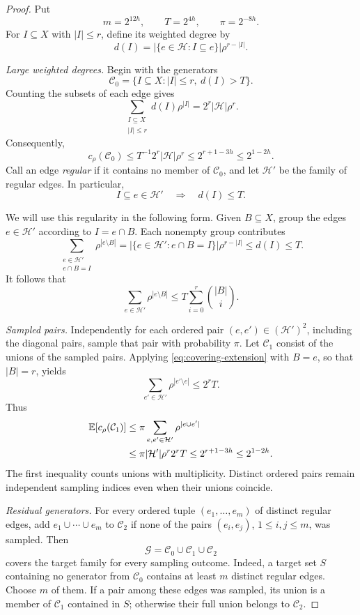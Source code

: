 \documentclass[11pt,letterpaper]{article}
\theoremstyle{definition}
\theoremstyle{remark}
\numberwithin{equation}{section}
\begin{document}
\begin{proof}
Put
\[
m=2^{12h},\qquad T=2^{4h},\qquad \pi=2^{-8h}.
\]
For \(I\subseteq X\) with \(|I|\le r\), define its weighted degree by
\[
d(I)=|\{e\in\mathcal H:I\subseteq e\}|\rho^{r-|I|}.
\]

\emph{Large weighted degrees.}
Begin with the generators
\[
\mathcal C_0=\{I\subseteq X:|I|\le r,\ d(I)>T\}.
\]
Counting the subsets of each edge gives
\[
\sum_{\substack{I\subseteq X\\|I|\le r}}d(I)\rho^{|I|}
=2^r|\mathcal H|\rho^r.
\]
Consequently,
\begin{equation}\label{eq:covering-initial-cost}
c_\rho(\mathcal C_0)
\le T^{-1}2^r|\mathcal H|\rho^r
\le2^{r+1-3h}\le2^{1-2h}.
\end{equation}
Call an edge \emph{regular} if it contains no member of \(\mathcal C_0\),
and let \(\mathcal H'\) be the family of regular edges. In particular,
\[
I\subseteq e\in\mathcal H'
\quad\Longrightarrow\quad d(I)\le T.
\]

We will use this regularity in the following form. Given \(B\subseteq X\),
group the edges \(e\in\mathcal H'\) according to \(I=e\cap B\).
Each nonempty group contributes
\[
\sum_{\substack{e\in\mathcal H'\\e\cap B=I}}
  \rho^{|e\setminus B|}
=|\{e\in\mathcal H':e\cap B=I\}|\rho^{r-|I|}
\le d(I)\le T.
\]
It follows that
\begin{equation}\label{eq:covering-extension}
\sum_{e\in\mathcal H'}\rho^{|e\setminus B|}
\le T\sum_{i=0}^r\binom{|B|}{i}.
\end{equation}

\emph{Sampled pairs.}
Independently for each ordered pair \((e,e')\in(\mathcal H')^2\),
including the diagonal pairs, sample that pair with probability \(\pi\).
Let \(\mathcal C_1\) consist of the unions of the sampled pairs. Applying
\eqref{eq:covering-extension} with \(B=e\), so that \(|B|=r\), yields
\[
\sum_{e'\in\mathcal H'}\rho^{|e'\setminus e|}\le2^rT.
\]
Thus
\begin{align}
\mathbb E[c_\rho(\mathcal C_1)]
&\le\pi\sum_{e,e'\in\mathcal H'}\rho^{|e\cup e'|}
\notag\\
&\le\pi|\mathcal H'|\rho^r2^rT
\le2^{r+1-3h}\le2^{1-2h}.
\label{eq:covering-pair-cost}
\end{align}
The first inequality counts unions with multiplicity. Distinct ordered
pairs remain independent sampling indices even when their unions coincide.

\emph{Residual generators.}
For every ordered tuple \((e_1,\ldots,e_m)\) of distinct regular edges,
add \(e_1\cup\cdots\cup e_m\) to \(\mathcal C_2\) if none of the pairs
\((e_i,e_j)\), \(1\le i,j\le m\), was sampled.
Then
\[
\mathcal G=\mathcal C_0\cup\mathcal C_1\cup\mathcal C_2
\]
covers the target family for every sampling outcome. Indeed, a target set
\(S\) containing no generator from \(\mathcal C_0\) contains at least \(m\)
distinct regular edges. Choose \(m\) of them. If a pair among these edges
was sampled, its union is a member of \(\mathcal C_1\) contained in \(S\);
otherwise their full union belongs to \(\mathcal C_2\).


\end{proof}
\end{document}
